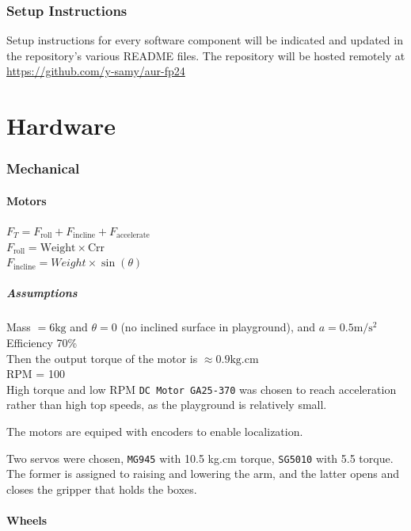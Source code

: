 \documentclass[a4paper,12pt]{article}
\begin{document}
\section{Setup Instructions}
Setup instructions for every software component will be indicated and updated in the repository's various README files.
The repository will be hosted remotely at \url{https://github.com/y-samy/aur-fp24}

\part{Hardware}
\section{Mechanical}

\subsection{Motors}
$F_T = F_{\text{roll}} + F_{\text{incline}} + F_{\text{accelerate}}$\\
$F_{\text{roll}} = \text{Weight} \times \text{Crr}$ \\
$F_{\text{incline}} = Weight \times \sin{(\theta)}$
\subsubsection*{Assumptions}
Mass $= 6\text{kg}$ and $\theta = 0$ (no inclined surface in playground), and $a = 0.5 \text{m}/\text{s}^2$\\
Efficiency 70\%\\
Then the output torque of the motor is $\approx 0.9 \text{kg.cm}$\\
RPM = 100\\

High torque and low RPM \texttt{DC Motor GA25-370} was chosen to reach acceleration rather than high top speeds, as the playground is relatively small.

The motors are equiped with encoders to enable localization.

Two servos were chosen, \texttt{MG945} with 10.5 kg.cm torque, \texttt{SG5010} with 5.5 torque. The former is assigned to raising and lowering the arm, and the latter opens and closes the gripper that holds the boxes.

\subsection{Wheels}
\end{document}

